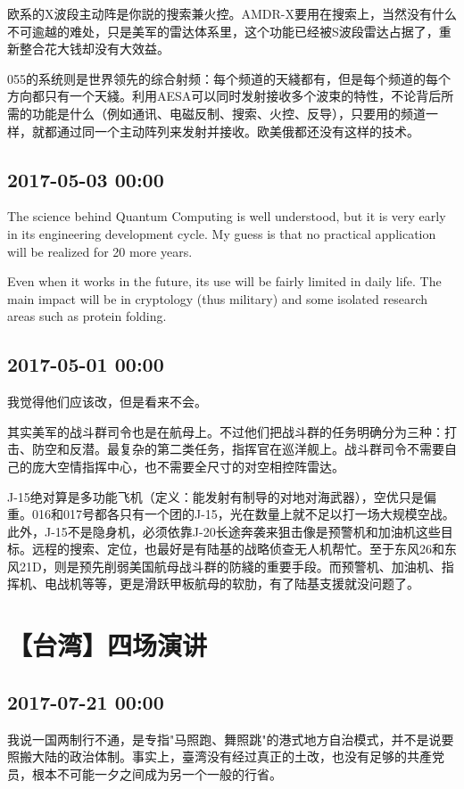 \documentclass[twocolumn]{ctexart}
\begin{document}
欧系的X波段主动阵是你説的搜索兼火控。AMDR-X要用在搜索上，当然没有什么不可逾越的难处，只是美军的雷达体系里，这个功能已经被S波段雷达占据了，重新整合花大钱却没有大效益。

055的系统则是世界领先的综合射频：每个频道的天綫都有，但是每个频道的每个方向都只有一个天綫。利用AESA可以同时发射接收多个波束的特性，不论背后所需的功能是什么（例如通讯、电磁反制、搜索、火控、反导），只要用的频道一样，就都通过同一个主动阵列来发射并接收。欧美俄都还没有这样的技术。\subsection*{2017-05-03 00:00}
The science behind Quantum Computing is well understood, but it is very early in its engineering development cycle. My guess is that no practical application will be realized for 20 more years.

Even when it works in the future, its use will be fairly limited in daily life. The main impact will be in cryptology (thus military) and some isolated research areas such as protein folding.\subsection*{2017-05-01 00:00}
我觉得他们应该改，但是看来不会。

其实美军的战斗群司令也是在航母上。不过他们把战斗群的任务明确分为三种：打击、防空和反潜。最复杂的第二类任务，指挥官在巡洋舰上。战斗群司令不需要自己的庞大空情指挥中心，也不需要全尺寸的对空相控阵雷达。

J-15绝对算是多功能飞机（定义：能发射有制导的对地对海武器），空优只是偏重。016和017号都各只有一个团的J-15，光在数量上就不足以打一场大规模空战。此外，J-15不是隐身机，必须依靠J-20长途奔袭来狙击像是预警机和加油机这些目标。远程的搜索、定位，也最好是有陆基的战略侦查无人机帮忙。至于东风26和东风21D，则是预先削弱美国航母战斗群的防綫的重要手段。而预警机、加油机、指挥机、电战机等等，更是滑跃甲板航母的软肋，有了陆基支援就没问题了。\section*{【台湾】四场演讲}
\subsection*{2017-07-21 00:00}
我说一国两制行不通，是专指"马照跑、舞照跳"的港式地方自治模式，并不是说要照搬大陆的政治体制。事实上，臺湾没有经过真正的土改，也没有足够的共產党员，根本不可能一夕之间成为另一个一般的行省。
\end{document}
